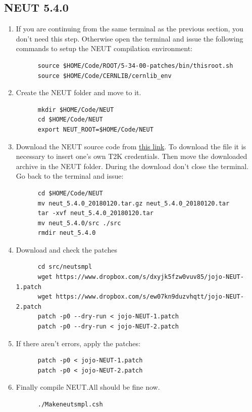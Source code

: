 \subsection{NEUT 5.4.0}
\begin{enumerate}[resume]
\item If you are continuing from the same terminal as the previous
  section, you don't need this step. Otherwise open the terminal and
  issue the following commands to setup the NEUT compilation
  environment:
\begin{lstlisting}
      source $HOME/Code/ROOT/5-34-00-patches/bin/thisroot.sh
      source $HOME/Code/CERNLIB/cernlib_env
\end{lstlisting}
\item Create the NEUT folder and move to it.
\begin{lstlisting}
      mkdir $HOME/Code/NEUT
      cd $HOME/Code/NEUT
      export NEUT_ROOT=$HOME/Code/NEUT
\end{lstlisting}
\item Download the NEUT source code from
  \href{https://www.t2k.org/asg/xsec/niwgdocs/neut/NEUT5.4.0}{this
    link}. To download the file it is necessary to insert one's own
  T2K credentials. Then move the downloaded archive in the NEUT
  folder. During the download don't close the terminal. Go back to the
  terminal and issue: 
\begin{lstlisting}
      cd $HOME/Code/NEUT
      mv neut_5.4.0_20180120.tar.gz neut_5.4.0_20180120.tar
      tar -xvf neut_5.4.0_20180120.tar
      mv neut_5.4.0/src ./src
      rmdir neut_5.4.0
\end{lstlisting}
\item Download and check the patches
\begin{lstlisting}
      cd src/neutsmpl
      wget https://www.dropbox.com/s/dxyjk5fzw0vuv85/jojo-NEUT-1.patch
      wget https://www.dropbox.com/s/ew07kn9duzvhqtt/jojo-NEUT-2.patch
      patch -p0 --dry-run < jojo-NEUT-1.patch
      patch -p0 --dry-run < jojo-NEUT-2.patch
\end{lstlisting}
\item If there aren't errors, apply the patches:
\begin{lstlisting}
      patch -p0 < jojo-NEUT-1.patch
      patch -p0 < jojo-NEUT-2.patch
\end{lstlisting}
\item Finally compile NEUT.\@ All should be fine now.
\begin{lstlisting}
      ./Makeneutsmpl.csh
\end{lstlisting}
\end{enumerate}

